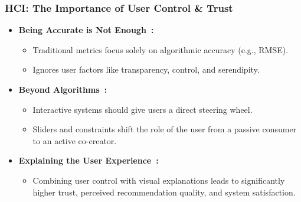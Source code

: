 \begin{frame}
    \frametitle{HCI: The Importance of User Control \& Trust}
    \begin{itemize}
        \item \textbf{Being Accurate is Not Enough~\cite{mcnee2006being}:}
            \begin{itemize}
                \item Traditional metrics focus solely on algorithmic accuracy (e.g., RMSE).
                \item Ignores user factors like transparency, control, and serendipity.
            \end{itemize}
        \item \textbf{Beyond Algorithms~\cite{swearingen2001beyond}:}
            \begin{itemize}
                \item Interactive systems should give users a direct steering wheel.
                \item Sliders and constraints shift the role of the user from a passive consumer to an active co-creator.
            \end{itemize}
        \item \textbf{Explaining the User Experience~\cite{knijnenburg2012explaining}:}
            \begin{itemize}
                \item Combining user control with visual explanations leads to significantly higher trust, perceived recommendation quality, and system satisfaction.
            \end{itemize}
    \end{itemize}
\end{frame}

